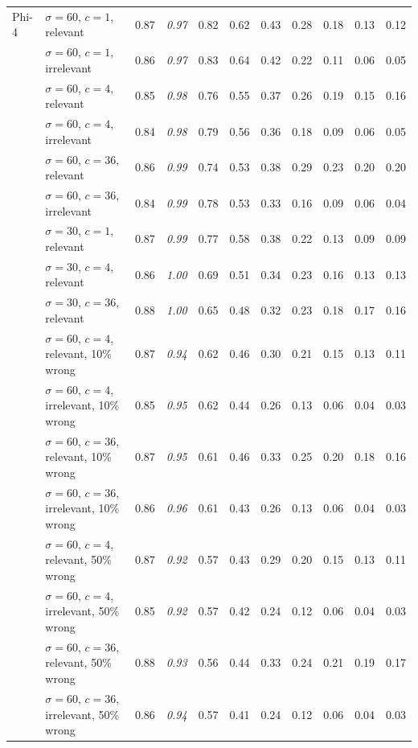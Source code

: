 \begin{tabular}{llrrrrrrrrr}
\midrule
Phi-4 & $\sigma = 60$, $c = 1$, relevant & 0.87 & \textit{0.97} & 0.82 & 0.62 & 0.43 & 0.28 & 0.18 & 0.13 & 0.12 \\
 & $\sigma = 60$, $c = 1$, irrelevant & 0.86 & \textit{0.97} & 0.83 & 0.64 & 0.42 & 0.22 & 0.11 & 0.06 & 0.05 \\
 & $\sigma = 60$, $c = 4$, relevant & 0.85 & \textit{0.98} & 0.76 & 0.55 & 0.37 & 0.26 & 0.19 & 0.15 & 0.16 \\
 & $\sigma = 60$, $c = 4$, irrelevant & 0.84 & \textit{0.98} & 0.79 & 0.56 & 0.36 & 0.18 & 0.09 & 0.06 & 0.05 \\
 & $\sigma = 60$, $c = 36$, relevant & 0.86 & \textit{0.99} & 0.74 & 0.53 & 0.38 & 0.29 & 0.23 & 0.20 & 0.20 \\
 & $\sigma = 60$, $c = 36$, irrelevant & 0.84 & \textit{0.99} & 0.78 & 0.53 & 0.33 & 0.16 & 0.09 & 0.06 & 0.04 \\
 & $\sigma = 30$, $c = 1$, relevant & 0.87 & \textit{0.99} & 0.77 & 0.58 & 0.38 & 0.22 & 0.13 & 0.09 & 0.09 \\
 & $\sigma = 30$, $c = 4$, relevant & 0.86 & \textit{1.00} & 0.69 & 0.51 & 0.34 & 0.23 & 0.16 & 0.13 & 0.13 \\
 & $\sigma = 30$, $c = 36$, relevant & 0.88 & \textit{1.00} & 0.65 & 0.48 & 0.32 & 0.23 & 0.18 & 0.17 & 0.16 \\
 & $\sigma = 60$, $c = 4$, relevant, 10\% wrong & 0.87 & \textit{0.94} & 0.62 & 0.46 & 0.30 & 0.21 & 0.15 & 0.13 & 0.11 \\
 & $\sigma = 60$, $c = 4$, irrelevant, 10\% wrong & 0.85 & \textit{0.95} & 0.62 & 0.44 & 0.26 & 0.13 & 0.06 & 0.04 & 0.03 \\
 & $\sigma = 60$, $c = 36$, relevant, 10\% wrong & 0.87 & \textit{0.95} & 0.61 & 0.46 & 0.33 & 0.25 & 0.20 & 0.18 & 0.16 \\
 & $\sigma = 60$, $c = 36$, irrelevant, 10\% wrong & 0.86 & \textit{0.96} & 0.61 & 0.43 & 0.26 & 0.13 & 0.06 & 0.04 & 0.03 \\
 & $\sigma = 60$, $c = 4$, relevant, 50\% wrong & 0.87 & \textit{0.92} & 0.57 & 0.43 & 0.29 & 0.20 & 0.15 & 0.13 & 0.11 \\
 & $\sigma = 60$, $c = 4$, irrelevant, 50\% wrong & 0.85 & \textit{0.92} & 0.57 & 0.42 & 0.24 & 0.12 & 0.06 & 0.04 & 0.03 \\
 & $\sigma = 60$, $c = 36$, relevant, 50\% wrong & 0.88 & \textit{0.93} & 0.56 & 0.44 & 0.33 & 0.24 & 0.21 & 0.19 & 0.17 \\
 & $\sigma = 60$, $c = 36$, irrelevant, 50\% wrong & 0.86 & \textit{0.94} & 0.57 & 0.41 & 0.24 & 0.12 & 0.06 & 0.04 & 0.03 \\

\end{tabular}
